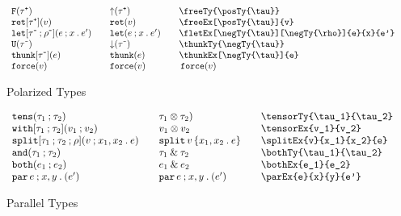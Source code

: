 \documentclass[11pt]{article}
\begin{document}
\begin{figure}

  \begin{small}
    \begin{displaymath}
      \begin{array}{l@{\qquad}l@{\qquad}l@{\qquad}l}
        \freeTy{\posTy{\tau}}                         & \freeTy*{\posTy{\tau}}    & \verb|\freeTy{\posTy{\tau}}|                         \\
        \freeEx[\posTy{\tau}]{v}                      & \freeEx*[\posTy{\tau}]{v} & \verb|\freeEx[\posTy{\tau}]{v}|                      \\
        \fletEx[\negTy{\tau}][\negTy{\rho}]{e}{x}{e'} & \fletEx*{e}{x}{e'}        & \verb|\fletEx[\negTy{\tau}][\negTy{\rho}]{e}{x}{e'}| \\
        \thunkTy{\negTy{\tau}}                        & \thunkTy*{\negTy{\tau}}   & \verb|\thunkTy{\negTy{\tau}}|                        \\
        \thunkEx[\negTy{\tau}]{e}                     & \thunkEx*{e}              & \verb|\thunkEx[\negTy{\tau}]{e}|                     \\
        \forceEx{v}                                   & \forceEx*{v}              & \verb||\forceEx{v}
      \end{array}
    \end{displaymath}
  \end{small}

  \caption{Polarized Types}
  \label{fig:pol}
\end{figure}

\begin{figure}

  \begin{small}
    \begin{displaymath}
      \begin{array}{l@{\qquad}l@{\qquad}l@{\qquad}l}
        \tensorTy{\tau_1}{\tau_2} & \tensorTy*{\tau_1}{\tau_2} & \verb|\tensorTy{\tau_1}{\tau_2}| \\
        \tensorEx{v_1}{v_2}       & \tensorEx*{v_1}{v_2}       & \verb|\tensorEx{v_1}{v_2}|       \\
        \splitEx{v}{x_1}{x_2}{e}  & \splitEx*{v}{x_1}{x_2}{e}  & \verb|\splitEx{v}{x_1}{x_2}{e}|  \\
        \bothTy{\tau_1}{\tau_2}   & \bothTy*{\tau_1}{\tau_2}   & \verb|\bothTy{\tau_1}{\tau_2}|   \\
        \bothEx{e_1}{e_2}         & \bothEx*{e_1}{e_2}         & \verb|\bothEx{e_1}{e_2}|         \\
        \parEx{e}{x}{y}{e'}       & \parEx*{e}{x}{y}{e'}       & \verb|\parEx{e}{x}{y}{e'}|
      \end{array}
    \end{displaymath}
  \end{small}

  \caption{Parallel Types}
  \label{fig:par}
\end{figure}
\end{document}
